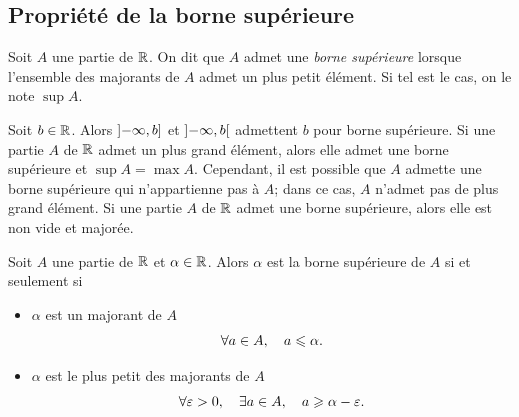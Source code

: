 \documentclass{magnoliaold}
\begin{document}
\subsection{Propriété de la borne supérieure}


\begin{definition}[utile=-3]
Soit $A$ une partie de $\mathbb{R}$. On dit que $A$ admet une \emph{borne supérieure} lorsque
l'ensemble des majorants de $A$ admet un plus petit élément. Si tel est le cas,
on le note $\sup A$.
\end{definition}

\begin{remarques}
\remarque Soit $b\in\mathbb{R}$. Alors $\left]-\infty,b\right]$ et $\left]-\infty,b\right[$
  admettent $b$ pour borne supérieure.
\remarque Si une partie $A$ de $\mathbb{R}$ admet un plus grand élément, alors elle
  admet une borne supérieure et $\sup A = \max A$. Cependant, il est possible
  que $A$ admette une borne supérieure qui n'appartienne pas à $A$; dans ce cas,
  $A$ n'admet pas de plus grand élément.
\remarque Si une partie $A$ de $\mathbb{R}$ admet une borne supérieure, alors elle est
  non vide et majorée.
\end{remarques}

\begin{proposition}
  Soit $A$ une partie de $\mathbb{R}$ et $\alpha\in\mathbb{R}$. Alors $\alpha$ est la borne supérieure
  de $A$ si et seulement si
  \begin{itemize}
  \item $\alpha$ est un majorant de $A$
    \[\forall a\in A ,\quad a\leqslant\alpha.\]
  \item $\alpha$ est le plus petit des majorants de $A$
    \[\forall \varepsilon>0 ,\quad \exists a\in A ,\quad a\geqslant \alpha-\varepsilon.\]
  \end{itemize}
  \end{proposition}
  
\end{document}
